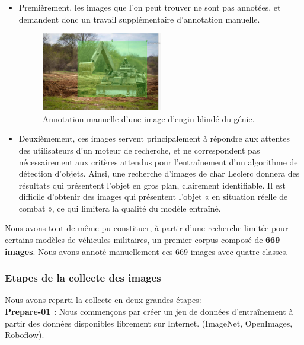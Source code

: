 \begin{itemize}
    \item Premièrement, les images que l’on peut trouver ne sont pas annotées, et demandent donc un travail supplémentaire d’annotation manuelle.
          \begin{figure}[H]
              \center
              \includegraphics[width=0.5\textwidth]{./images/anotation-manuelle.png}
              \caption{Annotation manuelle d’une image d’engin blindé du génie.}\label{fig:anotation-manuelle}
          \end{figure}
    \item Deuxièmement, ces images servent principalement à répondre aux attentes des utilisateurs d’un moteur de recherche, et ne correspondent pas nécessairement aux critères attendus pour l’entraînement d’un algorithme de détection d’objets.
          Ainsi, une recherche d’images de char Leclerc donnera des résultats qui présentent l’objet en gros plan, clairement identifiable.
          Il est difficile d’obtenir des images qui présentent l’objet « en situation réelle de combat », ce qui limitera la qualité du modèle entraîné.
\end{itemize}

Nous avons tout de même pu constituer, à partir d’une recherche limitée pour certains modèles de véhicules militaires, un premier corpus composé de \textbf{669 images}. Nous avons annoté manuellement ces 669 images avec quatre classes.\\


\subsubsection{Etapes de la collecte des images}

Nous avons reparti la collecte en deux grandes étapes:\\

\indent \textbf{Prepare-01 :} Nous commençons par créer un jeu de données d'entraînement à partir des données disponibles librement sur Internet. (ImageNet, OpenImages, Roboflow).

